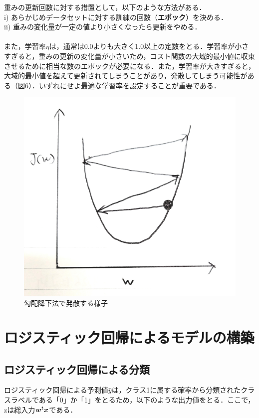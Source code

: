 \documentclass[a4j, 11pt]{jsarticle}
\numberwithin{equation}{section}
\newcommand{\mathbm}[1]{{\mbox{\boldmath $#1$}}}
\begin{document}
\indent 重みの更新回数に対する措置として，以下のような方法がある．\\
\indent i)  あらかじめデータセットに対する訓練の回数（\textbf{エポック}）を決める．\\
\indent ii) 重みの変化量が一定の値より小さくなったら更新をやめる．\\
\\
\indent また，学習率$\eta$は，通常は0.0よりも大きく1.0以上の定数をとる．学習率が小さすぎると，重みの更新の変化量が小さいため，コスト関数の大域的最小値に収束させるために相当な数のエポックが必要になる．また，学習率が大きすぎると，大域的最小値を超えて更新されてしまうことがあり，発散してしまう可能性がある（図6）．いずれにせよ最適な学習率を設定することが重要である．\\

\begin{figure}[htbp]
    \centering
    \mbox{{\includegraphics[scale=0.1]{fig6_grad_hassan.jpg}}}
    \caption{勾配降下法で発散する様子}
    \label{発散}
\end{figure}

\newpage

\section{ロジスティック回帰によるモデルの構築}
\subsection{ロジスティック回帰による分類}
\indent ロジスティック回帰による予測値$\hat{y}$は，クラス1に属する確率から分類されたクラスラベルである「0」か「1」をとるため，以下のような出力値をとる．ここで，zは総入力$\mathbm{w^tx}$である．\\
\end{document}
